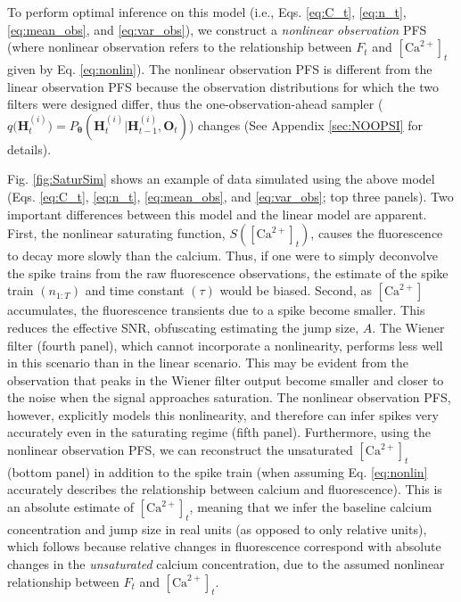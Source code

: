 \documentclass[10pt]{article}
\providecommand{\ve}[1]{\boldsymbol{#1}}
\providecommand{\ve}[1]{\boldsymbol{#1}}
\newcommand{\thetn}{\ve{\theta}}
\newcommand{\p}{P_{\thetn}}
\newcommand{\q}{q\big(\ve{H}_t^{(i)}\big)}
\newcommand{\Ca}{[\text{Ca}^{2+}]}
\begin{document}
\noindent To perform optimal inference on this model (i.e., Eqs. \ref{eq:C_t}, \ref{eq:n_t}, \ref{eq:mean_obs}, and \ref{eq:var_obs}), we construct a \emph{nonlinear observation} PFS (where nonlinear observation refers to the relationship between $F_t$ and $\Ca_t$ given by Eq. \ref{eq:nonlin}). The nonlinear observation PFS is different from the linear observation PFS because the observation distributions for which the two filters were designed differ, thus the one-observation-ahead sampler ($\q=\p(\ve{H}_t^{(i)} | \ve{H}_{t-1}^{(i)}, \ve{O}_t)$) changes (See Appendix \ref{sec:NOOPSI} for details). 

Fig. \ref{fig:SaturSim} shows an example of data simulated using the above model (Eqs. \ref{eq:C_t}, \ref{eq:n_t}, \ref{eq:mean_obs}, and \ref{eq:var_obs}; top three panels).  Two important differences between this model and the linear model are apparent.  First, the nonlinear saturating function, $S(\Ca_t)$,  causes the fluorescence to decay more slowly than the calcium. Thus, if one were to simply deconvolve the spike trains from the raw fluorescence observations, the estimate of  the spike train $(n_{1:T})$ and time constant $(\tau)$ would be biased.  Second, as $\Ca$ accumulates, the fluorescence transients due to a spike become smaller.  This reduces the effective SNR, obfuscating estimating the jump size, $A$. The Wiener filter (fourth panel), which cannot incorporate a nonlinearity, performs less well in this scenario than in the linear scenario.  This may be evident from the observation that peaks in the Wiener filter output become smaller and closer to the noise when the signal approaches saturation.   The nonlinear observation PFS, however, explicitly models this nonlinearity, and therefore can infer spikes very accurately even in the saturating regime (fifth panel). Furthermore, using the nonlinear observation PFS, we can reconstruct the unsaturated $\Ca_t$ (bottom panel) in addition to the spike train (when assuming Eq. \ref{eq:nonlin} accurately describes the relationship between calcium and fluorescence). This is an absolute estimate of $\Ca_t$, meaning that we infer the baseline calcium concentration and jump size in real units (as opposed to only relative units), which follows because relative changes in fluorescence correspond with absolute changes in the \emph{unsaturated} calcium concentration, due to the assumed nonlinear relationship between $F_t$ and $\Ca_t$.  
\end{document}
